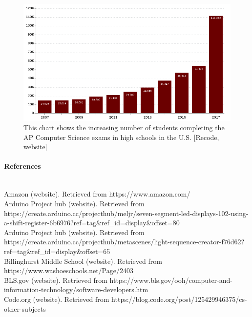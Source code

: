 \documentclass[12pt, letterpaper]{report}
\begin{document}
\begin{figure}[H]
    \centering
    \includegraphics[scale=0.85]{figure14.png}
    \captionsetup{justification=centering}
    \caption{This chart shows the increasing number of students completing the AP Computer Science exams in high schools in the U.S. [Recode, website]}
\end{figure}

\paragraph*{\fontsize{14pt}{12pt}\selectfont References \\ \\}

Amazon (website). Retrieved from https://www.amazon.com/ \\

Arduino Project hub (website). Retrieved from  https://create.arduino.cc/projecthub/meljr/seven-segment-led-displays-102-using-a-shift-register-6b6976?ref=tag&ref\_id=display\&offset=80 \\

Arduino Project hub (website). Retrieved from  https://create.arduino.cc/projecthub/metascenes/light-sequence-creator-f76d62?ref=tag&ref\_id=display&offset=65 \\

Billinghurst Middle School (website). Retrieved from https://www.washoeschools.net/Page/2403 \\

BLS.gov (website). Retrieved from https://www.bls.gov/ooh/computer-and-information-technology/software-developers.htm \\

Code.org (website). Retrieved from https://blog.code.org/post/125429946375/cs-other-subjects \\
\end{document}
